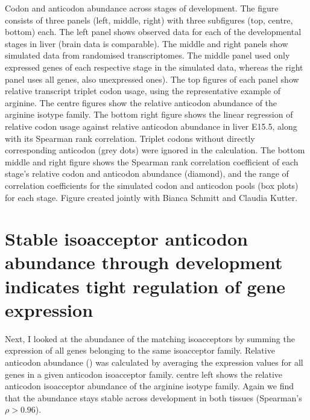 \vspace{-\baselineskip}
    {Codon and anticodon abundance across stages of development.}
    {The figure consists of three panels (left, middle, right) with three
    subfigures (top, centre, bottom) each. The left panel shows observed data
    for each of the developmental stages in liver (brain data is comparable).
    The middle and right panels show simulated data from randomised
    transcriptomes. The middle panel used only expressed genes of each
    respective stage in the simulated data, whereas the right panel uses all
    genes, also unexpressed ones). The top figures of each panel show relative
    \mrna transcript triplet codon usage, using the representative example of
    arginine. The centre figures show the relative \trna anticodon abundance of
    the arginine isotype family. The bottom right figure shows the linear
    regression of relative codon usage against relative anticodon abundance in
    liver E15.5, along with its Spearman rank correlation. Triplet codons
    without directly corresponding anticodon (grey dots) were ignored in the
    calculation. The bottom middle and right figure shows the Spearman rank
    correlation coefficient of each stage’s relative codon and anticodon
    abundance (diamond), and the range of correlation coefficients for the
    simulated codon and anticodon pools (box plots) for each stage. Figure
    created jointly with Bianca Schmitt and Claudia Kutter.}
\endgroup

\section{Stable isoacceptor anticodon abundance through development indicates
tight regulation of  gene expression}

Next, I looked at the abundance of the matching \trna isoacceptors by summing
the expression of all \trna genes belonging to the same isoacceptor family.
Relative anticodon abundance (\raa) was calculated by averaging the expression
values for all \trna genes in a given anticodon isoacceptor family.
 centre left shows the relative anticodon
isoacceptor abundance of the arginine isotype family. Again we find that the
abundance stays stable across development in both tissues (Spearman’s \(\rho >
0.96\)).

